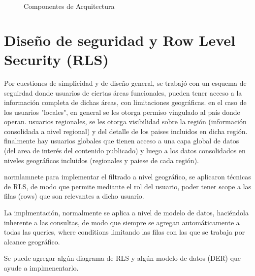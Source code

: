 \begin{figure}
    \caption{Componentes de Arquitectura}
    \label{fig:arq_components2} 
\end{figure}

\section{Diseño de seguridad y Row Level Security (RLS)}
Por cuestiones de simplicidad y de diseño general, se trabajó con un esquema de seguirdad donde usuarios de ciertas áreas funcionales, pueden tener acceso a la información completa de dichas áreas, con limitaciones geográficas. en el caso de los usuarios "locales", en general se les otorga permiso vingulado al país donde operan. usuarios regionales, se les otorga visibilidad sobre la región (información consolidada a nivel regional) y del detalle de los paises incluidos en dicha región.
finalmente hay usuarios globales que tienen acceso a una capa global de datos (del area de interés del contenido publicado) y luego a los datos consolidados en niveles geográficos incluidos (regionales y paiese de cada región).

normlamnete para implementar el filtrado a nivel geográfico, se aplicaron técnicas de RLS, de modo que permite mediante el rol del usuario, poder tener scope a las filas (rows) que son relevantes a dicho usuario.

La implmentación, normalmente se aplica a nivel de modelo de datos, haciéndola inherente a las consultas, de modo que siempre se agregan automáticamente a todas las queries, where conditions limitando las filas con las que se trabaja por alcance geográfico.

Se puede agregar algún diagrama de RLS y algún modelo de datos (DER) que ayude a implmenentarlo.

